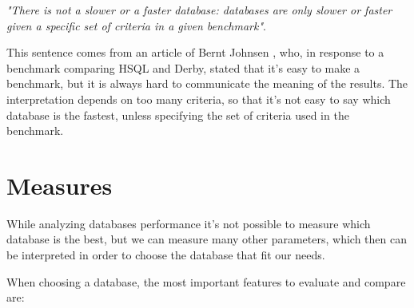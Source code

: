 \label{axiom} \emph{"There is not a slower or a faster database: databases are only slower or faster given a specific set of criteria in a given benchmark"}.

This sentence comes from an article of Bernt Johnsen \cite{Bernt}, who, in response to a benchmark comparing HSQL and Derby, stated that it's easy to make a benchmark, but it is always hard to communicate the meaning of the results. The interpretation depends on too many criteria, so that it's not easy to say which database is the fastest, unless specifying the set of criteria used in the benchmark.
	
		\section{Measures}\label{measures}
While analyzing databases performance it's not possible to measure which database is the best, but we can measure many other parameters, which then can be interpreted in order to choose the database that fit our needs.

When choosing a database, the most important features to evaluate and compare are:

